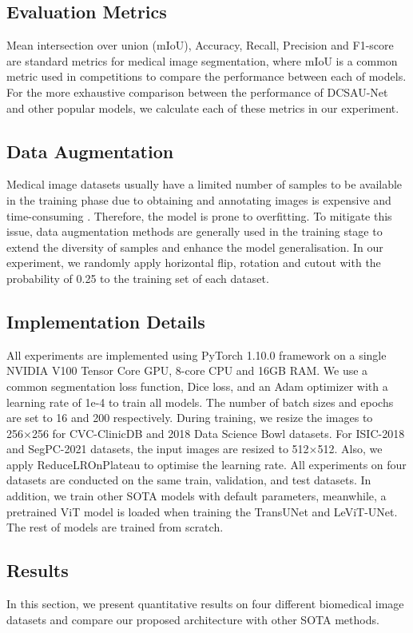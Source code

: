 \documentclass[a4paper,fleqn]{cas-dc}
\begin{document}
\subsection{Evaluation Metrics}
\label{ssec:subhead}
Mean intersection over union (mIoU), Accuracy, Recall, Precision and F1-score are standard metrics for medical image segmentation, where mIoU is a common metric used in competitions to compare the performance between each of models. For the more exhaustive comparison between the performance of DCSAU-Net and other popular models, we calculate each of these metrics in our experiment.

\subsection{Data Augmentation}
\label{ssec:subhead}
Medical image datasets usually have a limited number of samples to be available in the training phase due to obtaining and annotating images is expensive and time-consuming \cite{chen2021targeted}. Therefore, the model is prone to overfitting. To mitigate this issue, data augmentation methods are generally used in the training stage to extend the diversity of samples and enhance the model generalisation. In our experiment, we randomly apply horizontal flip, rotation and cutout with the probability of 0.25 to the training set of each dataset.
\subsection{Implementation Details}
\label{ssec:subhead}
All experiments are implemented using PyTorch 1.10.0 framework on a single NVIDIA V100 Tensor Core GPU, 8-core CPU and 16GB RAM. We use a common segmentation loss function, Dice loss, and an Adam optimizer with a learning rate of 1e-4 to train all models. The number of batch sizes and epochs are set to 16 and 200 respectively. During training, we resize the images to 256×256 for CVC-ClinicDB and 2018 Data Science Bowl datasets. For ISIC-2018 and SegPC-2021 datasets, the input images are resized to 512×512. Also, we apply ReduceLROnPlateau to optimise the learning rate. All experiments on four datasets are conducted on the same train, validation, and test datasets. In addition, we train other SOTA models with default parameters, meanwhile, a pretrained ViT model is loaded when training the TransUNet and LeViT-UNet. The rest of models are trained from scratch.
\subsection{Results}
\label{ssec:subhead}
In this section, we present quantitative results on four different biomedical image datasets and compare our proposed architecture with other SOTA methods.
\end{document}
